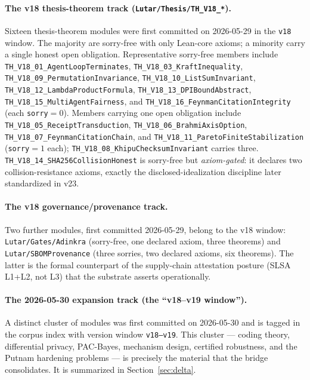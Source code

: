 \documentclass[11pt]{article}
\theoremstyle{plain}
\theoremstyle{definition}
\theoremstyle{remark}
\begin{document}
\paragraph{The v18 thesis-theorem track (\texttt{Lutar/Thesis/TH\_V18\_*}).}
Sixteen thesis-theorem modules were first committed on 2026-05-29 in the \texttt{v18}
window. The majority are sorry-free with only Lean-core axioms; a minority carry a
single honest open obligation. Representative sorry-free members include
\texttt{TH\_V18\_01\_AgentLoopTerminates}, \texttt{TH\_V18\_03\_KraftInequality},
\texttt{TH\_V18\_09\_PermutationInvariance}, \texttt{TH\_V18\_10\_ListSumInvariant},
\texttt{TH\_V18\_12\_LambdaProductFormula}, \texttt{TH\_V18\_13\_DPIBoundAbstract},
\texttt{TH\_V18\_15\_MultiAgentFairness}, and \texttt{TH\_V18\_16\_FeynmanCitationIntegrity}
(each \texttt{sorry}$=0$). Members carrying one open obligation include
\texttt{TH\_V18\_05\_ReceiptTransduction}, \texttt{TH\_V18\_06\_BrahmiAxisOption},
\texttt{TH\_V18\_07\_FeynmanCitationChain}, and \texttt{TH\_V18\_11\_ParetoFiniteStabilization}
(\texttt{sorry}$=1$ each); \texttt{TH\_V18\_08\_KhipuChecksumInvariant} carries three.
\texttt{TH\_V18\_14\_SHA256CollisionHonest} is sorry-free but \emph{axiom-gated}: it
declares two collision-resistance axioms, exactly the disclosed-idealization discipline
later standardized in v23.

\paragraph{The v18 governance/provenance track.}
Two further modules, first committed 2026-05-29, belong to the v18 window:
\texttt{Lutar/Gates/Adinkra} (sorry-free, one declared axiom, three theorems) and
\texttt{Lutar/SBOMProvenance} (three sorries, two declared axioms, six theorems). The
latter is the formal counterpart of the supply-chain attestation posture (SLSA L1+L2,
not L3) that the substrate asserts operationally.

\paragraph{The 2026-05-30 expansion track (the ``v18--v19 window'').}
A distinct cluster of modules was first committed on 2026-05-30 and is tagged in the
corpus index with version window \texttt{v18--v19}. This cluster --- coding theory,
differential privacy, PAC-Bayes, mechanism design, certified robustness, and the
Putnam hardening problems --- is precisely the material that the bridge consolidates.
It is summarized in Section~\ref{sec:delta}.
\end{document}
